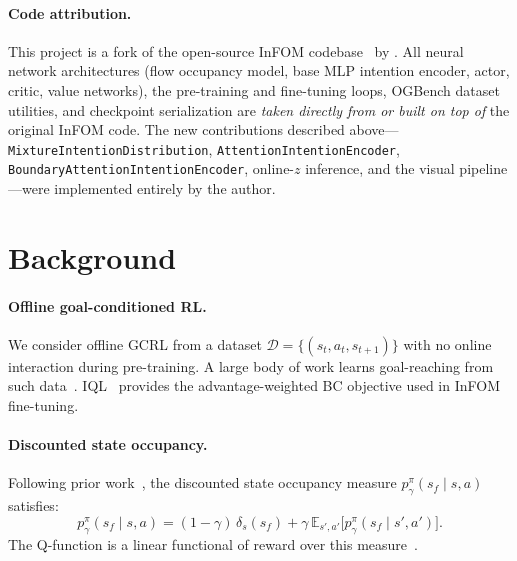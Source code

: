 \documentclass{article}
\newcommand{\base}{InFOM}
\begin{document}
\paragraph{Code attribution.}
This project is a fork of the open-source \base{}
codebase~\citep{zheng2025infom} by \citet{zheng2025infom}.
All neural network architectures (flow occupancy model, base MLP intention
encoder, actor, critic, value networks), the pre-training and fine-tuning
loops, OGBench dataset utilities, and checkpoint serialization are
\emph{taken directly from or built on top of} the original \base{} code.
The new contributions described above---\texttt{MixtureIntentionDistribution},
\texttt{AttentionIntentionEncoder},
\texttt{BoundaryAttentionIntentionEncoder},
online-$z$ inference, and the visual pipeline---were
implemented entirely by the author.

\section{Background}
\label{sec:background}

\paragraph{Offline goal-conditioned RL.}
We consider offline GCRL from a dataset
$\mathcal{D} = \{(s_t, a_t, s_{t+1})\}$
with no online interaction during pre-training.
A large body of work learns goal-reaching from such
data~\citep{ghosh2021gcsl,park2023hiql,eysenbach2022contrastive,park2025ogbenchbenchmarkingofflinegoalconditioned}.
IQL~\citep{kostrikov2021iql} provides the advantage-weighted
BC objective used in \base{} fine-tuning.

\paragraph{Discounted state occupancy.}
Following prior work~\citep{dayan1993successor,janner2020gamma,
touati2021fb,eysenbach2022contrastive},
the discounted state occupancy measure
$p^\pi_\gamma(s_f \mid s,a)$ satisfies:
\begin{equation}
  p^\pi_\gamma(s_f \mid s, a)
  = (1{-}\gamma)\,\delta_s(s_f)
  + \gamma\,\mathbb{E}_{s',a'}\bigl[p^\pi_\gamma(s_f \mid s', a')\bigr].
\end{equation}
The Q-function is a linear functional of reward over this
measure~\citep{barreto2017sf,touati2021fb}.
\end{document}
